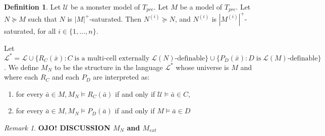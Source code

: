 \documentclass[12pt]{article}
\theoremstyle{definition}
\newtheorem{defi}[thm]{Definition}
\theoremstyle{mystyle}
\theoremstyle{remark}
\newtheorem{rem}[thm]{Remark}
\newcommand{\clos}[2]{#1^{(#2)}}
\begin{document}
\begin{defi} \label{ShelahExpPRC}
Let $\mathcal{U}$ be a monster model of $T_{prc}$. Let $M$ be a
model of $T_{prc}$. Let $N \succeq M$ such that $N$ is
$|M|^+$-saturated. Then $\clos{N}{i}\succeq N$, and $\clos{N}{i}$
is $|\clos{M}{i}|^+$-saturated, for all $i \in \{1, \ldots, n\}$.

Let $\mathcal{L}^* = \mathcal{L} \cup  \{R_C(\bar{x}) : C \; \mbox{is a multi-cell externally} \; \mathcal{L}(N)\mbox{-definable}\} \cup \{P_D(\bar{x}) : D \; \mbox{is} \; \mathcal{L}(M)\mbox{-definable}\}$.
We define $M_N$ to be the structure in the language $\mathcal{L}^*$
whose universe is $M$ and where each $R_C$ and each $P_D$ are interpreted as:
\begin{enumerate}
\item for every $\bar{a} \in M, M_N \models R_C(\bar{a})$ if and only if $\mathcal{U} \models \bar{a} \in C$,
\item for every $\bar{a} \in M, M_N \models P_D(\bar{a})$ if and only if $M \models \bar{a} \in D$
\end{enumerate}

\end{defi}

\begin{rem}
\textbf{OJO! DISCUSSION $M_N$ and $M_{ext}$}
\end{rem}
\end{document}

